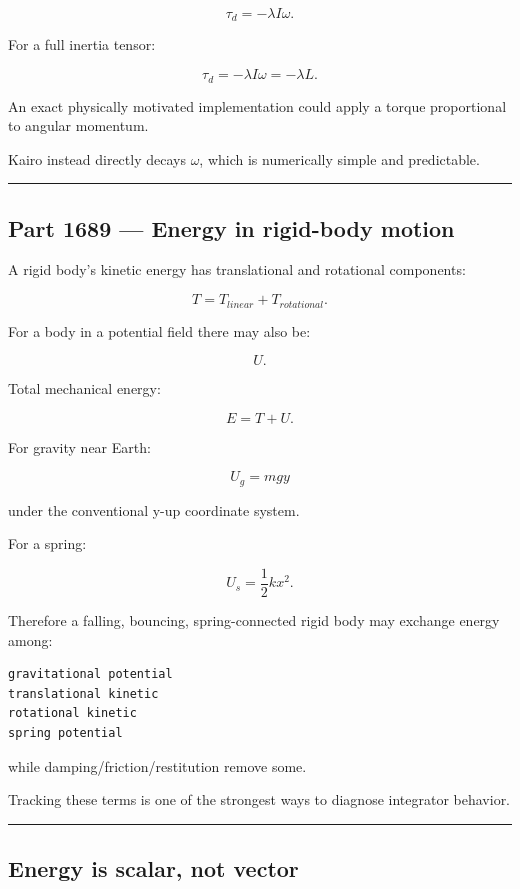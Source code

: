 \[
\boxed{
\tau_d
=
-\lambda I\omega.
}
\]

For a full inertia tensor:

\[
\tau_d
=
-\lambda I\omega
=
-\lambda L.
\]

An exact physically motivated implementation could apply a torque proportional to angular momentum.

Kairo instead directly decays \(\omega\), which is numerically simple and predictable.

\begin{center}\rule{0.5\linewidth}{0.5pt}\end{center}

\subsection{Part 1689 --- Energy in rigid-body motion}\label{06-engine-ii-ch039-part-1689-energy-in-rigid-body-motion}

A rigid body's kinetic energy has translational and rotational components:

\[
\boxed{
T
=
T_{linear}
+
T_{rotational}.
}
\]

For a body in a potential field there may also be:

\[
U.
\]

Total mechanical energy:

\[
\boxed{
E=T+U.
}
\]

For gravity near Earth:

\[
U_g
=
mgy
\]

under the conventional y-up coordinate system.

For a spring:

\[
U_s
=
\frac12kx^2.
\]

Therefore a falling, bouncing, spring-connected rigid body may exchange energy among:

\begin{verbatim}
gravitational potential
translational kinetic
rotational kinetic
spring potential
\end{verbatim}

while damping/friction/restitution remove some.

Tracking these terms is one of the strongest ways to diagnose integrator behavior.

\begin{center}\rule{0.5\linewidth}{0.5pt}\end{center}

\subsection{Energy is scalar, not vector}\label{06-engine-ii-ch039-energy-is-scalar-not-vector}

